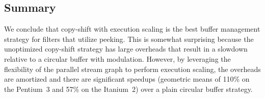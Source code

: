 \subsection{Summary}

We conclude that copy-shift with execution scaling is the best buffer
management strategy for filters that utilize peeking.  This is
somewhat surprising because the unoptimized copy-shift strategy has
large overheads that result in a slowdown relative to a circular
buffer with modulation.  However, by leveraging the flexibility of the
parallel stream graph to perform execution scaling, the overheads are
amortized and there are significant speedups (geometric means of 110\%
on the Pentium~3 and 57\% on the Itanium~2) over a plain circular buffer
strategy.





